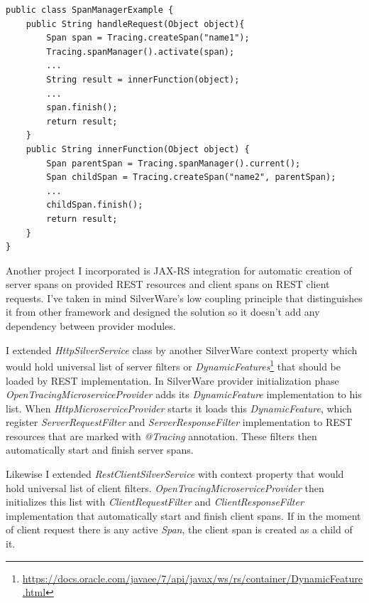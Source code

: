 \documentclass[12pt,oneside]{fithesis2}
\begin{document}
\begin{lstlisting}[caption = Usage of SpanManager, label = spanmanager, style=eclipse_java]
public class SpanManagerExample {
	public String handleRequest(Object object){
		Span span = Tracing.createSpan("name1");
		Tracing.spanManager().activate(span);
		...
		String result = innerFunction(object);
		...
		span.finish();
		return result;
	}
	public String innerFunction(Object object) {
		Span parentSpan = Tracing.spanManager().current();
		Span childSpan = Tracing.createSpan("name2", parentSpan);
		...
		childSpan.finish();
		return result;
	}
}
\end{lstlisting}

Another project I incorporated is JAX-RS integration for automatic creation of server spans on provided REST resources and client spans on REST client requests. I've taken in mind SilverWare's low coupling principle that distinguishes it from other framework and designed the solution so it doesn't add any dependency between provider modules.

I extended \textit{HttpSilverService} class by another SilverWare context property which would hold universal list of server filters or \textit{DynamicFeatures}\footnote{\url{https://docs.oracle.com/javaee/7/api/javax/ws/rs/container/DynamicFeature.html}} that should be loaded by REST implementation. In SilverWare provider initialization phase \textit{OpenTracingMicroserviceProvider} adds its \textit{DynamicFeature} implementation to his list. When \textit{HttpMicroserviceProvider} starts it loads this \textit{DynamicFeature}, which register \textit{ServerRequestFilter} and \textit{ServerResponseFilter} implementation to REST resources that are marked with \textit{@Tracing} annotation. These filters then automatically start and finish server spans. 

Likewise I extended \textit{RestClientSilverService} with context property that would hold universal list of client filters. \textit{OpenTracingMicroserviceProvider} then initializes this list with \textit{ClientRequestFilter} and \textit{ClientResponseFilter} implementation that automatically start and finish client spans. If in the moment of client request there is any active \textit{Span}, the client span is created as a child of it.
\end{document}
